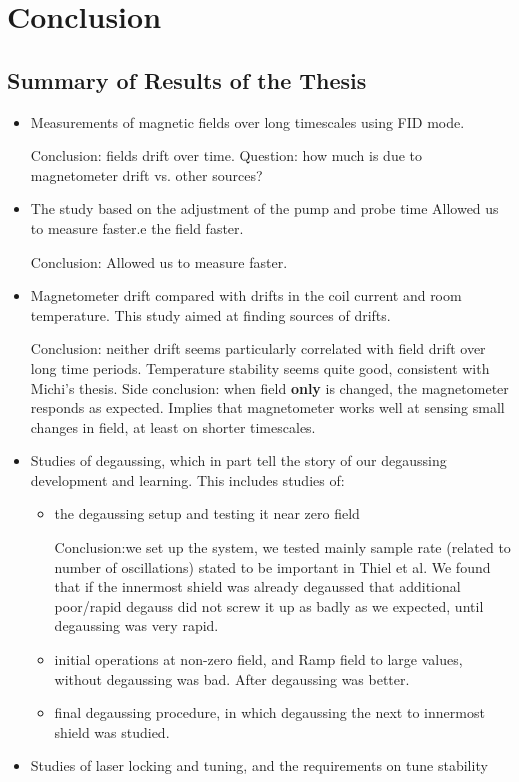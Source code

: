 \chapter{Conclusion\label{ch:Conclusion}}
\section{Summary of Results of the Thesis}
\begin{itemize}
\item Measurements of magnetic fields over long timescales using FID mode.

Conclusion: fields drift over time.  Question: how much is due to
 magnetometer drift vs. other sources?

\item The study based on the adjustment of the pump and probe time Allowed us to measure faster.e the field faster.
  
Conclusion: Allowed us to measure faster.
\item Magnetometer drift compared with drifts in the coil current and
  room temperature.  This study aimed at finding sources of drifts.
  
Conclusion: neither drift seems
particularly correlated with field drift over long time periods.
 Temperature stability seems quite good, consistent with Michi's
 thesis.  Side conclusion: when field {\bf only} is changed, the
 magnetometer responds as expected.  Implies that magnetometer works
 well at sensing small changes in field, at least on shorter
 timescales.
\item Studies of degaussing, which in part tell the story of our
  degaussing development and learning.  This includes studies of:
  \begin{itemize}
    \item the degaussing setup and testing it near zero field
    
Conclusion:we set up the
     system, we tested mainly sample rate (related to number of
     oscillations) stated to be important in Thiel et al.\cite{doi:10.1063/1.2713433}  We found
     that if the innermost shield was already degaussed that
     additional poor/rapid degauss did not screw it up as badly as we
     expected, until degaussing was very rapid.
    \item initial operations at non-zero field, and
Ramp field to large values, without
    degaussing was bad.  After degaussing was better.
    
    \item final degaussing procedure, in which degaussing the next to
      innermost shield was studied.
  \end{itemize}
\item Studies of laser locking and tuning, and the requirements on
  tune stability
  \end{itemize}
